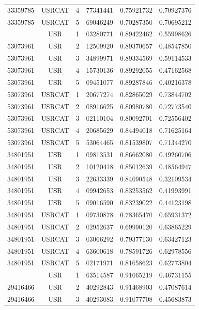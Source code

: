 \begin{longtable}{cccccc}
33359785 & USRCAT & 4 & 77341441 & 0.75921732 & 0.70927376\\
33359785 & USRCAT & 5 & 69046249 & 0.70287350 & 0.70695212\\
\hline
\pagebreak
53073961 & USR    & 1 & 03280771 & 0.89422462 & 0.55998626\\%
53073961 & USR    & 2 & 12509920 & 0.89370657 & 0.48547850\\
53073961 & USR    & 3 & 34899971 & 0.89334569 & 0.59114533\\
53073961 & USR    & 4 & 15730136 & 0.89292055 & 0.47162568\\
53073961 & USR    & 5 & 09451077 & 0.89287846 & 0.40216378\\
53073961 & USRCAT & 1 & 20677274 & 0.82865029 & 0.73844702\\%
53073961 & USRCAT & 2 & 08916625 & 0.80980780 & 0.72773540\\
53073961 & USRCAT & 3 & 02110104 & 0.80092701 & 0.72556402\\
53073961 & USRCAT & 4 & 20685629 & 0.84494018 & 0.71625164\\
53073961 & USRCAT & 5 & 53064465 & 0.81539807 & 0.71344270\\
\hline
34801951 & USR    & 1 & 09813531 & 0.86662080 & 0.49260706\\%
34801951 & USR    & 2 & 10120418 & 0.85012639 & 0.48564947\\
34801951 & USR    & 3 & 22633339 & 0.84690548 & 0.32109534\\
34801951 & USR    & 4 & 09942653 & 0.83253562 & 0.41993991\\
34801951 & USR    & 5 & 09016590 & 0.83239022 & 0.44123198\\
34801951 & USRCAT & 1 & 09730878 & 0.78365470 & 0.65931372\\%
34801951 & USRCAT & 2 & 02952637 & 0.69990120 & 0.63865229\\
34801951 & USRCAT & 3 & 03066292 & 0.79377130 & 0.63427123\\
34801951 & USRCAT & 4 & 63600618 & 0.78591726 & 0.62978556\\
34801951 & USRCAT & 5 & 02171971 & 0.81658623 & 0.62773804\\
\hline
\pagebreak
29416466 & USR    & 1 & 63514587 & 0.91665219 & 0.46731155\\%
29416466 & USR    & 2 & 40292843 & 0.91468903 & 0.47087614\\
29416466 & USR    & 3 & 40293083 & 0.91077708 & 0.45683873\\

\end{longtable}
